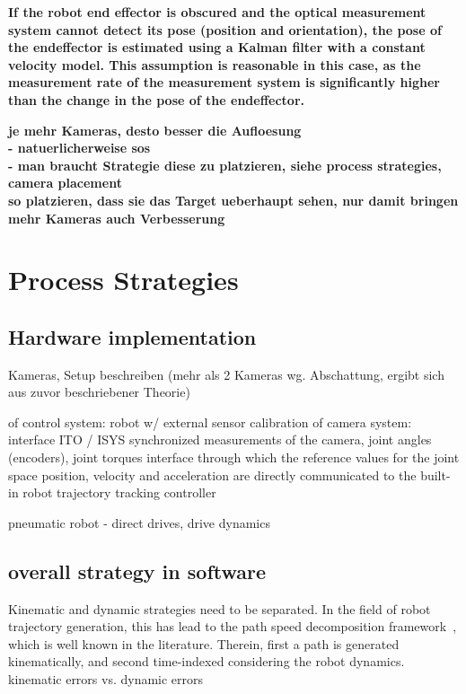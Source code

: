 \documentclass[5p,times,procedia]{elsarticle}
\begin{document}
\textbf{
If the robot end effector is obscured and the optical measurement system cannot detect its pose (position and orientation), the pose of the endeffector is estimated using a Kalman filter with a constant velocity model. This assumption is reasonable in this case, as the measurement rate of the measurement system is significantly higher than the change in the pose of the endeffector.}

\textbf{
je mehr Kameras, desto besser die Aufloesung \\
- natuerlicherweise sos \\
- man braucht Strategie diese zu platzieren, siehe process strategies, camera placement \\
so platzieren, dass sie das Target ueberhaupt sehen, nur damit bringen mehr Kameras auch Verbesserung }

\section{Process Strategies}
\subsection{Hardware implementation} 

Kameras, Setup beschreiben (mehr als 2 Kameras wg. Abschattung, ergibt sich aus zuvor beschriebener Theorie)


of control system: robot w/ external sensor
calibration of camera system: interface ITO / ISYS
synchronized measurements of the camera, joint angles (encoders), joint torques 
interface through which the reference values for the joint space position, velocity and acceleration are directly communicated to the built-in robot trajectory tracking controller

pneumatic robot - direct drives, drive dynamics 

\subsection{overall strategy in software}
Kinematic and dynamic strategies need to be separated. 
In the field of robot trajectory generation, this has lead to the path speed decomposition framework~\cite{Choset05}, which is well known in the literature. 
Therein, first a path is generated kinematically, and second time-indexed considering the robot dynamics. 
kinematic errors vs. dynamic errors 
\end{document}

